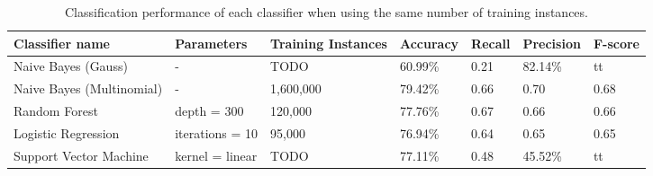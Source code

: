 \begin{table}[]
\centering
\caption{Classification performance of each classifier when using the same number of training instances.}
\begin{tabular}{ |p{3cm}||p{3cm}|p{2cm}|p{1.5cm}|p{1.5cm}|p{1.5cm}|p{1.5cm}| }
 \hline
 Classifier name &          Parameters &             Training Instances &    Accuracy &      Recall &     Precision& F-score \\
 \hline
 Naive Bayes (Gauss)        &-&            TODO&                 60.99\%&        0.21&       82.14\%& tt\\
  \hline
 Naive Bayes (Multinomial)  &-&                     1,600,000&                79.42\%&        0.66&       0.70& 0.68\\
  \hline
 Random Forest              &depth = 300&            120,000&                 77.76\%&        0.67&       0.66& 0.66\\
  \hline
 Logistic Regression        &iterations = 10&            95,000&                 76.94\%&        0.64&       0.65& 0.65\\
  \hline
 Support Vector Machine     &kernel = linear&            TODO&                 77.11\%&        0.48&       45.52\%& tt\\
 \hline
\end{tabular}
\label{tab:evaluations_euqal}
\end{table}



